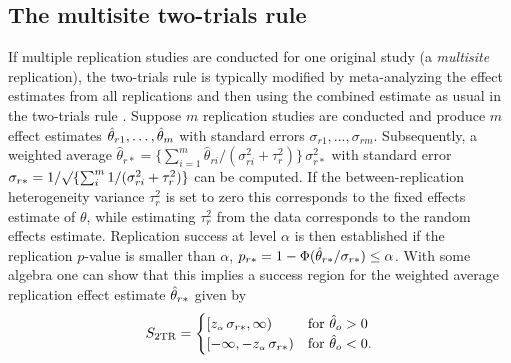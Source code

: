 \documentclass[a4paper, 11pt]{article}
\begin{document}
\subsection{The multisite two-trials rule}
If multiple replication studies are conducted for one original study (a
\emph{multisite} replication), the two-trials rule is typically modified by
meta-analyzing the effect estimates from all replications and then using the
combined estimate as usual in the two-trials rule \citep[see \eg{} the ``Many
labs'' projects from][]{Klein2014, Klein2018}. Suppose $m$ replication studies
are conducted and produce $m$ effect estimates $\hat{\theta}_{r1}, \dots, \hat{\theta}_{m}$
with standard errors $\sigma_{r1}, \dots, \sigma_{rm}$. Subsequently, a weighted
average
$\hat{\theta}_{r*} = \{\sum_{i = 1}^{m} \hat{\theta}_{ri}/(\sigma^{2}_{ri} + \tau^{2}_{r})\}\,\sigma_{r*}^{2}$
with standard error
$\sigma_{r*} = 1/\surd\{\sum_{i}^{m}1/(\sigma^{2}_{ri} + \tau^{2}_{r})\}$ can be
computed. If the between-replication heterogeneity variance $\tau^{2}_{r}$ is
set to zero this corresponds to the fixed effects estimate of $\theta$, while
estimating $\tau^{2}_{r}$ from the data corresponds to the random effects
estimate. Replication success at level $\alpha$ is then established if the
replication $p$-value is smaller than $\alpha$, \ie{}
$p_{r*} = 1 - \Phi(\hat{\theta}_{r*}/\sigma_{r*}) \leq \alpha$. With some algebra one
can show that this implies a success region for the weighted average replication
effect estimate $\hat{\theta}_{r*}$ given by
\begin{align*}
  S_{\text{2TR}} =
  \begin{cases}
    \left[z_{\scriptscriptstyle \alpha} \, \sigma_{r*}, \infty \right) & \text{for} ~ \hat{\theta}_{o} > 0 \\
    \left[-\infty, -z_{\scriptscriptstyle \alpha} \, \sigma_{r*} \right) & \text{for} ~ \hat{\theta}_{o} < 0.
  \end{cases}
\end{align*}
\end{document}
